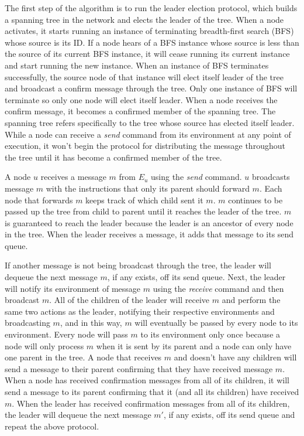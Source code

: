 \documentclass[english]{article}
\begin{document}
The first step of the algorithm is to run the leader election protocol, which builds a spanning tree in the network and elects the leader of the tree. When a node activates, it starts running an instance of terminating breadth-first search (BFS) whose source is its ID. If a node hears of a BFS instance whose source is less than the source of its current BFS instance, it will cease running its current instance and start running the new instance. When an instance of BFS terminates successfully, the source node of that instance will elect itself leader of the tree and broadcast a confirm message through the tree. Only one instance of BFS will terminate so only one node will elect itself leader. When a node receives the confirm message, it becomes a confirmed member of the spanning tree. The spanning tree refers specifically to the tree whose source has elected itself leader. While a node can receive a \textit{send} command from its environment at any point of execution, it won't begin the protocol for distributing the message throughout the tree until it has become a confirmed member of the tree.


A node $u$ receives a message $m$ from $E_u$ using the \textit{send} command. $u$ broadcasts message $m$ with the instructions that only its parent should forward $m$. Each node that forwards $m$ keeps track of which child sent it $m$. $m$ continues to be passed up the tree from child to parent until it reaches the leader of the tree. $m$ is guaranteed to reach the leader because the leader is an ancestor of every node in the tree. When the leader receives a message, it adds that message to its send queue.


If another message is not being broadcast through the tree, the leader will dequeue the next message $m$, if any exists, off its send queue. Next, the leader will notify its environment of message $m$ using the \textit{receive} command and then broadcast $m$. All of the children of the leader will receive $m$ and perform the same two actions as the leader, notifying their respective environments and broadcasting $m$, and in this way, $m$ will eventually be passed by every node to its environment. Every node will pass $m$ to its environment only once because a node will only process $m$ when it is sent by its parent and a node can only have one parent in the tree. A node that receives $m$ and doesn't have any children will send a message to their parent confirming that they have received message $m$. When a node has received confirmation messages from all of its children, it will send a message to its parent confirming that it (and all its children) have received $m$. When the leader has received confirmation messages from all of its children, the leader will dequeue the next message $m'$, if any exists, off its send queue and repeat the above protocol. 
\end{document}
